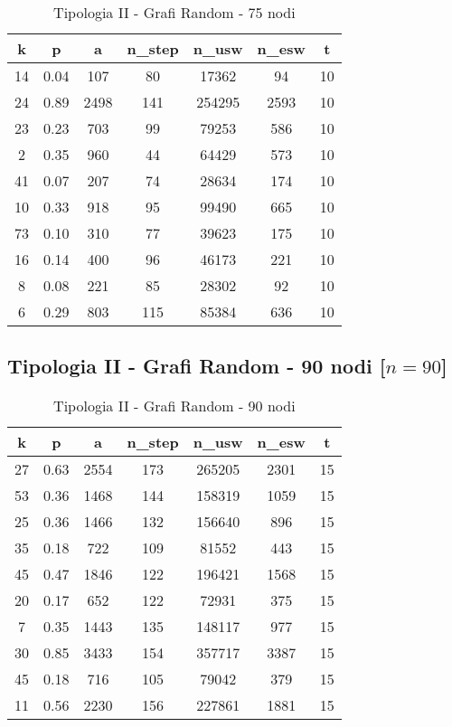 \begin{table}[H]
\centering
\begin{tabular}{|c|c|c|c|c|c|c|}
\hline
\textbf{k} & \textbf{p} & \textbf{a} & \textbf{n\_step} & \textbf{n\_usw} & \textbf{n\_esw} & \textbf{t} \\ \hline
14 & 0.04 & 107 & 80 & 17362 & 94 & 10 \\ \hline
24 & 0.89 & 2498 & 141 & 254295 & 2593 & 10 \\ \hline
23 & 0.23 & 703 & 99 & 79253 & 586 & 10 \\ \hline
2 & 0.35 & 960 & 44 & 64429 & 573 & 10 \\ \hline
41 & 0.07 & 207 & 74 & 28634 & 174 & 10 \\ \hline
10 & 0.33 & 918 & 95 & 99490 & 665 & 10 \\ \hline
73 & 0.10 & 310 & 77 & 39623 & 175 & 10 \\ \hline
16 & 0.14 & 400 & 96 & 46173 & 221 & 10 \\ \hline
8 & 0.08 & 221 & 85 & 28302 & 92 & 10 \\ \hline
6 & 0.29 & 803 & 115 & 85384 & 636 & 10 \\ \hline
\end{tabular}
\caption{Tipologia II - Grafi Random - 75 nodi}
\label{tab:sperimentazione-tipo1-75nodi}
\end{table}

\subsection{Tipologia II - Grafi Random - 90 nodi [$n=90$]}

\begin{table}[H]
\centering
\begin{tabular}{|c|c|c|c|c|c|c|}
\hline
\textbf{k} & \textbf{p} & \textbf{a} & \textbf{n\_step} & \textbf{n\_usw} & \textbf{n\_esw} & \textbf{t} \\ \hline
27 & 0.63 & 2554 & 173 & 265205 & 2301 & 15 \\ \hline
53 & 0.36 & 1468 & 144 & 158319 & 1059 & 15 \\ \hline
25 & 0.36 & 1466 & 132 & 156640 & 896 & 15 \\ \hline
35 & 0.18 & 722 & 109 & 81552 & 443 & 15 \\ \hline
45 & 0.47 & 1846 & 122 & 196421 & 1568 & 15 \\ \hline
20 & 0.17 & 652 & 122 & 72931 & 375 & 15 \\ \hline
7 & 0.35 & 1443 & 135 & 148117 & 977 & 15 \\ \hline
30 & 0.85 & 3433 & 154 & 357717 & 3387 & 15 \\ \hline
45 & 0.18 & 716 & 105 & 79042 & 379 & 15 \\ \hline
11 & 0.56 & 2230 & 156 & 227861 & 1881 & 15 \\ \hline
\end{tabular}
\caption{Tipologia II - Grafi Random - 90 nodi}
\label{tab:sperimentazione-tipo1-90nodi}
\end{table}

